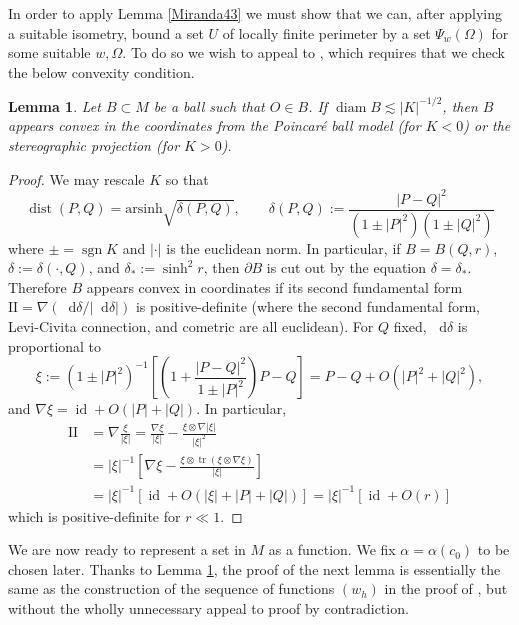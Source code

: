 \documentclass[reqno,10pt]{amsart}
\DeclareMathOperator{\diam}{diam}
\DeclareMathOperator{\id}{id}
\DeclareMathOperator{\sgn}{sgn}
\newcommand{\tr}{\operatorname{tr}}
\newcommand*\dif{\mathop{}\!\mathrm{d}}
\DeclareMathOperator{\dist}{dist}
\newcommand{\Two}{\mathrm{I\!I}}
\newtheorem{lemma}[theorem]{Lemma}
\theoremstyle{definition}
\numberwithin{equation}{section}
\begin{document}
In order to apply Lemma \ref{Miranda43} we must show that we can, after applying a suitable isometry, bound a set $U$ of locally finite perimeter by a set $\Psi_w(\Omega)$ for some suitable $w, \Omega$.
To do so we wish to appeal to \cite[Theorem 4.8]{Giusti77}, which requires that we check the below convexity condition.

\begin{lemma}\label{convex balls}
Let $B \subset M$ be a ball such that $O \in B$.
If $\diam B \lesssim |K|^{-1/2}$, then $B$ appears convex in the coordinates from the Poincar\'e ball model (for $K < 0$) or the stereographic projection (for $K > 0$).
\end{lemma}
\begin{proof}
We may rescale $K$ so that
$$\dist(P, Q) = \mathrm{arsinh} \sqrt{\delta(P, Q)}, \qquad \delta(P, Q) := \frac{|P - Q|^2}{(1 \pm |P|^2)(1 \pm |Q|^2)}$$
where $\pm = \sgn K$ and $|\cdot|$ is the euclidean norm.
In particular, if $B = B(Q, r)$, $\delta := \delta(\cdot, Q)$, and $\delta_* := \sinh^2 r$, then $\partial B$ is cut out by the equation $\delta = \delta_*$.
Therefore $B$ appears convex in coordinates if its second fundamental form $\Two = \nabla(\dif \delta/|\dif \delta|)$ is positive-definite (where the second fundamental form, Levi-Civita connection, and cometric are all euclidean).
For $Q$ fixed, $\dif \delta$ is proportional to 
$$\xi := (1 \pm |P|^2)^{-1} \left[\left(1 + \frac{|P - Q|^2}{1 \pm |P|^2}\right)P - Q\right] = P - Q + O(|P|^2 + |Q|^2),$$
and $\nabla \xi = \id + O(|P| + |Q|)$.
In particular,
\begin{align*}
\Two &= \nabla\frac{\xi}{|\xi|} = \frac{\nabla \xi}{|\xi|} - \frac{\xi \otimes \nabla|\xi|}{|\xi|^2} \\
&= |\xi|^{-1} \left[\nabla \xi - \frac{\xi \otimes \tr(\xi \otimes \nabla \xi)}{|\xi|}\right] \\
&= |\xi|^{-1} [\id + O(|\xi| + |P| + |Q|)] = |\xi|^{-1} [\id + O(r)]
\end{align*}
which is positive-definite for $r \ll 1$.
\end{proof}

We are now ready to represent a set in $M$ as a function.
We fix $\alpha = \alpha(c_0)$ to be chosen later.
Thanks to Lemma \ref{convex balls}, the proof of the next lemma is essentially the same as the construction of the sequence of functions $(w_h)$ in the proof of \cite[Teorema 4.4]{Miranda66}, but without the wholly unnecessary appeal to proof by contradiction.
\end{document}
